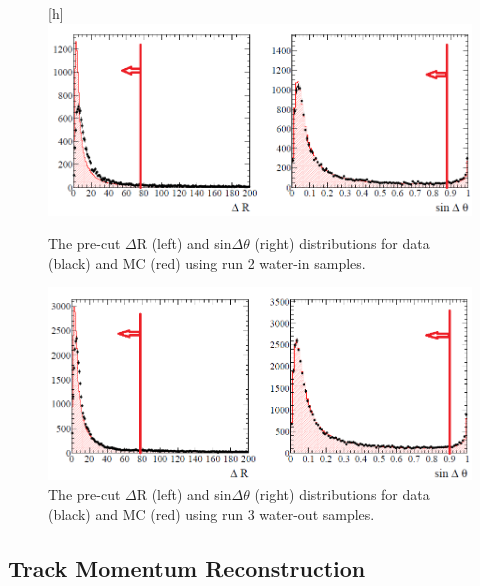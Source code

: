\begin{figure}
\begin{center}[h]
\includegraphics[width=6in]{Figures/matchpar1.png}
\end{center}
\caption{The pre-cut $\Delta$R (left) and sin$\Delta\theta$ (right) distributions for data (black) and MC (red) using run 2 water-in samples.}
\label{fig:matchpar1}
\end{figure}

\begin{figure}[h]
\begin{center}
\includegraphics[width=6in]{Figures/matchpar2.png}
\end{center}
\caption{The pre-cut $\Delta$R (left) and sin$\Delta\theta$ (right) distributions for data (black) and MC (red) using run 3 water-out samples.}
\label{fig:matchpar2}
\end{figure}

\subsection{Track Momentum Reconstruction}
\label{sec:momrecon}


